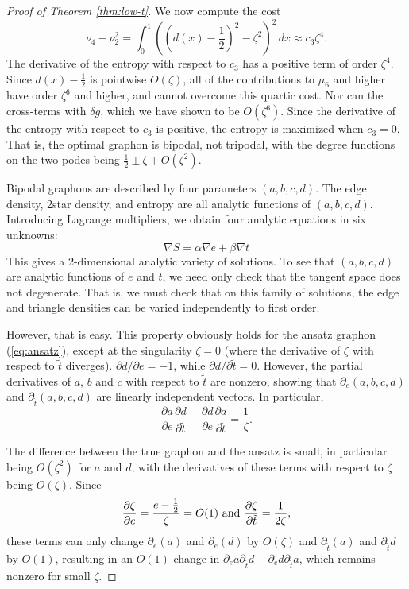 \documentclass[12pt]{amsart}
\newcommand{\1}{\mathbf{1}}
\begin{document}
\begin{proof}[Proof of Theorem \ref{thm:low-t}]
We now compute the cost 
\begin{equation} 
\nu_4 - \nu_2^2 = \int_0^1 ((d(x)-\frac12)^2-\zeta^2)^2 \, dx \approx c_3 \zeta^4. 
\end{equation} 
The derivative of the entropy with respect to $c_3$ has a positive term of order $\zeta^4$. Since $d(x)-\frac12$ is pointwise
$O(\zeta)$, all of the contributions to $\mu_6$ and higher have order $\zeta^6$ and higher, and cannot overcome this 
quartic cost. Nor can the cross-terms with $\delta g$, which we have shown to be $O(\zeta^6)$. Since the derivative of the 
entropy with respect to $c_3$ is positive, the entropy is maximized when $c_3=0$. That is, the optimal graphon is 
bipodal, not tripodal, with the degree functions on the two podes being $\frac12 \pm \zeta + O(\zeta^2)$. 

\smallskip

 Bipodal graphons are described by four parameters $(a,b,c,d)$. The edge density, 2star density, and 
entropy are all analytic functions of $(a,b,c,d)$. Introducing Lagrange multipliers, we obtain four 
analytic equations in six unknowns: 
\begin{equation}
\nabla S  =  \alpha \nabla e + \beta \nabla t 
\end{equation}
This gives a 2-dimensional analytic variety of solutions. To see that $(a,b,c,d)$ are analytic functions of $e$ and $t$,
we need only check that the tangent space does not degenerate. That is, we must check that on this family of solutions, 
the edge and triangle densities can be varied independently to first order. 

However, that is easy. This property obviously holds for the ansatz graphon (\ref{eq:ansatz}), except at the singularity 
$\zeta=0$ (where the derivative of $\zeta$ with respect to $\tilde t$ diverges). 
$\partial d/\partial e=-1$, while $\partial d/\partial \tilde t=0$. However, 
the partial derivatives of $a$, $b$ and $c$ with respect to $\tilde t$ are nonzero, showing
that $\partial_e(a,b,c,d)$ and $\partial_{\tilde t}(a,b,c,d)$ are linearly independent 
vectors. In particular, 
\begin{equation} 
\frac{\partial a}{\partial e} \frac{\partial d}{\partial \tilde t} - 
\frac{\partial d}{\partial e} \frac{\partial a}{\partial \tilde t} = \frac{1}{\zeta}.
\end{equation}

The difference between the true graphon and the ansatz is small, in particular being
$O(\zeta^2)$ for $a$ and $d$, with the derivatives of these terms with respect to 
$\zeta$ being $O(\zeta)$. Since 
\begin{equation}
\frac{\partial \zeta}{\partial e} = \frac{e-\frac12}{\zeta}=O(1) \hbox{ and }
\frac{\partial \zeta}{\partial \tilde t} = \frac{1}{2\zeta},
\end{equation}
these terms can only change $\partial_e(a)$ and $\partial_e(d)$ by $O(\zeta)$ and 
$\partial_{\tilde t}(a)$ and $\partial_{\tilde t}d$ by $O(1)$, resulting in an $O(1)$
change in $\partial_ea \partial_{\tilde t}d - \partial_e d \partial_{\tilde t}a$,
which remains nonzero for small $\zeta$. 


\end{proof}
\end{document}
